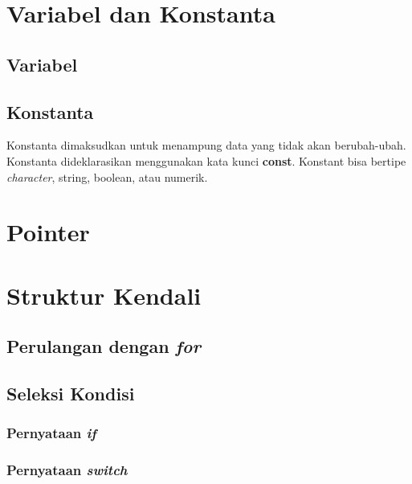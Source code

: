 \section{Variabel dan Konstanta}

\subsection{Variabel}

\subsection{Konstanta}

Konstanta dimaksudkan untuk menampung data yang tidak akan berubah-ubah. Konstanta dideklarasikan menggunakan kata kunci \textbf{const}. Konstant bisa bertipe \textit{character}, string, boolean, atau numerik.

\section{Pointer}

\section{Struktur Kendali}

\subsection{Perulangan dengan \textit{for}}


\subsection{Seleksi Kondisi}

\subsubsection{Pernyataan \textit{if}}


\subsubsection{Pernyataan \textit{switch}}


